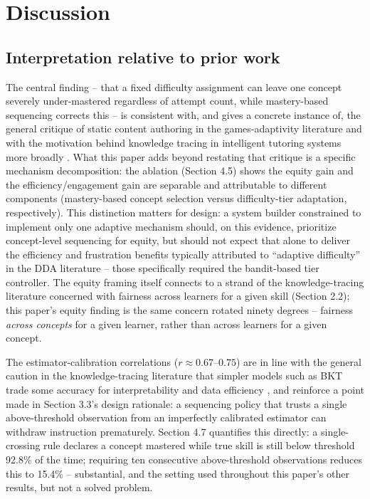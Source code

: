 \documentclass[11pt]{article}
\begin{document}
\section{Discussion}

\subsection{Interpretation relative to prior work}

The central finding -- that a fixed difficulty assignment can leave one concept severely under-mastered regardless of attempt count, while mastery-based sequencing corrects this -- is consistent with, and gives a concrete instance of, the general critique of static content authoring in the games-adaptivity literature \cite{ref3,ref24} and with the motivation behind knowledge tracing in intelligent tutoring systems more broadly \cite{ref16,ref17}. What this paper adds beyond restating that critique is a specific mechanism decomposition: the ablation (Section 4.5) shows the equity gain and the efficiency/engagement gain are separable and attributable to different components (mastery-based concept selection versus difficulty-tier adaptation, respectively). This distinction matters for design: a system builder constrained to implement only one adaptive mechanism should, on this evidence, prioritize concept-level sequencing for equity, but should not expect that alone to deliver the efficiency and frustration benefits typically attributed to ``adaptive difficulty'' in the DDA literature \cite{ref22,ref23} -- those specifically required the bandit-based tier controller. The equity framing itself connects to a strand of the knowledge-tracing literature concerned with fairness across learners for a given skill \cite{ref34,ref35} (Section 2.2); this paper's equity finding is the same concern rotated ninety degrees -- fairness \textit{across concepts} for a given learner, rather than across learners for a given concept.

The estimator-calibration correlations ($r \approx 0.67$--$0.75$) are in line with the general caution in the knowledge-tracing literature that simpler models such as BKT trade some accuracy for interpretability and data efficiency \cite{ref19}, and reinforce a point made in Section 3.3's design rationale: a sequencing policy that trusts a single above-threshold observation from an imperfectly calibrated estimator can withdraw instruction prematurely. Section 4.7 quantifies this directly: a single-crossing rule declares a concept mastered while true skill is still below threshold 92.8\% of the time; requiring ten consecutive above-threshold observations reduces this to 15.4\% -- substantial, and the setting used throughout this paper's other results, but not a solved problem.
\end{document}

